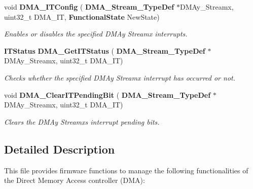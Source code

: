 \begin{DoxyCompactItemize}
void \textbf{ D\+M\+A\+\_\+\+I\+T\+Config} (\textbf{ D\+M\+A\+\_\+\+Stream\+\_\+\+Type\+Def} $\ast$D\+M\+Ay\+\_\+\+Streamx, uint32\+\_\+t D\+M\+A\+\_\+\+IT, \textbf{ Functional\+State} New\+State)
\begin{DoxyCompactList}\small\item\em Enables or disables the specified D\+M\+Ay Streamx interrupts. \end{DoxyCompactList}\item 
\textbf{ I\+T\+Status} \textbf{ D\+M\+A\+\_\+\+Get\+I\+T\+Status} (\textbf{ D\+M\+A\+\_\+\+Stream\+\_\+\+Type\+Def} $\ast$D\+M\+Ay\+\_\+\+Streamx, uint32\+\_\+t D\+M\+A\+\_\+\+IT)
\begin{DoxyCompactList}\small\item\em Checks whether the specified D\+M\+Ay Streamx interrupt has occurred or not. \end{DoxyCompactList}\item 
void \textbf{ D\+M\+A\+\_\+\+Clear\+I\+T\+Pending\+Bit} (\textbf{ D\+M\+A\+\_\+\+Stream\+\_\+\+Type\+Def} $\ast$D\+M\+Ay\+\_\+\+Streamx, uint32\+\_\+t D\+M\+A\+\_\+\+IT)
\begin{DoxyCompactList}\small\item\em Clears the D\+M\+Ay Streamx\textquotesingle{}s interrupt pending bits. \end{DoxyCompactList}\end{DoxyCompactItemize}


\subsection{Detailed Description}
This file provides firmware functions to manage the following functionalities of the Direct Memory Access controller (D\+MA)\+: 

